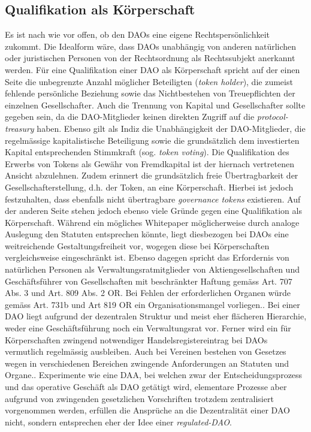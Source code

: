 \documentclass[a4paper,12pt]{report}
\begin{document}
	\subsection{Qualifikation als Körperschaft}
	\startsubsection
    Es ist nach wie vor offen, ob den DAOs eine eigene  Rechtspersönlichkeit zukommt. Die Idealform wäre, dass DAOs unabhängig von anderen natürlichen oder juristischen Personen von der Rechtsordnung als Rechtssubjekt anerkannt werden. Für eine Qualifikation einer DAO als Körperschaft spricht auf der einen Seite die unbegrenzte Anzahl möglicher Beteiligten (\textit{token holder}), die zumeist fehlende persönliche Beziehung sowie das Nichtbestehen von Treuepflichten der einzelnen Gesellschafter. Auch die Trennung von Kapital und Gesellschafter sollte gegeben sein, da die DAO-Mitglieder keinen direkten Zugriff auf die \textit{protocol-treasury} haben. Ebenso gilt als Indiz die Unabhängigkeit der DAO-Mitglieder, die regelmässige kapitalistische Beteiligung sowie die grundsätzlich dem investierten Kapital entsprechenden Stimmkraft (sog. \textit{token voting}).  Die Qualifikation des Erwerbs von Tokens als Gewähr von Fremdkapital ist der hiernach vertretenen Ansicht abzulehnen. Zudem erinnert die grundsätzlich freie Übertragbarkeit der Gesellschafterstellung, d.h. der Token, an eine Körperschaft. Hierbei ist jedoch festzuhalten, dass ebenfalls nicht übertragbare \textit{governance tokens} existieren. Auf der anderen Seite stehen jedoch ebenso viele Gründe gegen eine Qualifikation als Körperschaft. Während ein mögliches Whitepaper möglicherweise durch analoge Auslegung den Statuten entsprechen könnte, liegt diesbezogen bei DAOs eine weitreichende Gestaltungsfreiheit vor, wogegen diese bei Körperschaften vergleichsweise eingeschränkt ist. Ebenso dagegen spricht das Erfordernis von natürlichen Personen als Verwaltungsratmitglieder von Aktiengesellschaften und Geschäftsführer von Gesellschaften mit beschränkter Haftung gemäss Art. 707 Abs. 3 und Art. 809 Abs. 2 OR. Bei Fehlen der erforderlichen Organen würde gemäss Art. 731b und Art 819 OR ein Organisationsmangel vorliegen.. Bei einer DAO liegt aufgrund der dezentralen Struktur und meist eher flächeren Hierarchie, weder eine Geschäftsführung noch ein Verwaltungsrat vor. Ferner wird ein für Körperschaften zwingend notwendiger Handelsregistereintrag bei DAOs vermutlich regelmässig ausbleiben. Auch bei Vereinen bestehen von Gesetzes wegen in verschiedenen Bereichen zwingende Anforderungen an Statuten und Organe.. Experimente wie eine DAA, bei welchen zwar der Entscheidungsprozess und das operative Geschäft als DAO getätigt wird, elementare Prozesse aber aufgrund von zwingenden gesetzlichen Vorschriften trotzdem zentralisiert vorgenommen werden, erfüllen die Ansprüche an die Dezentralität einer DAO nicht, sondern entsprechen eher der Idee einer \textit{regulated-DAO}.
	\closesection
	
\end{document}
